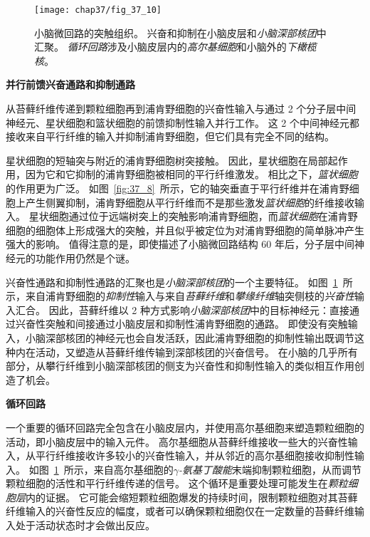 \begin{figure}[htbp]
	\centering
	\texttt{[image: chap37/fig\_37\_10]}
	\caption{小脑微回路的突触组织。
		兴奋和抑制在小脑皮层和\textit{小脑深部核团}中汇聚。
		\textit{循环回路}涉及小脑皮层内的\textit{高尔基细胞}和小脑外的\textit{下橄榄核}\cite{raymond1996cerebellum}。}
	\label{fig:37_10}
\end{figure}


\textbf{并行前馈兴奋通路和抑制通路}


从苔藓纤维传递到颗粒细胞再到浦肯野细胞的兴奋性输入与通过 2 个分子层中间神经元、星状细胞和篮状细胞的前馈抑制性输入并行工作。
这 2 个中间神经元都接收来自平行纤维的输入并抑制浦肯野细胞，但它们具有完全不同的结构。


星状细胞的短轴突与附近的浦肯野细胞树突接触。
因此，星状细胞在局部起作用，因为它和它抑制的浦肯野细胞被相同的平行纤维激发。
相比之下，\textit{篮状细胞}的作用更为广泛。
如图~\ref{fig:37_8}~所示，它的轴突垂直于平行纤维并在浦肯野细胞上产生侧翼抑制，浦肯野细胞从平行纤维而不是那些激发\textit{篮状细胞}的纤维接收输入。
星状细胞通过位于远端树突上的突触影响浦肯野细胞，而\textit{篮状细胞}在浦肯野细胞的细胞体上形成强大的突触，并且似乎被定位为对浦肯野细胞的简单脉冲产生强大的影响。
值得注意的是，即使描述了小脑微回路结构 60 年后，分子层中间神经元的功能作用仍然是个谜。


兴奋性通路和抑制性通路的汇聚也是\textit{小脑深部核团}的一个主要特征。
如图~\ref{fig:37_10}~所示，来自浦肯野细胞的\textit{抑制性}输入与来自\textit{苔藓纤维}和\textit{攀缘纤维}轴突侧枝的\textit{兴奋性}输入汇合。
因此，苔藓纤维以 2 种方式影响\textit{小脑深部核团}中的目标神经元：直接通过兴奋性突触和间接通过小脑皮层和抑制性浦肯野细胞的通路。
即使没有突触输入，小脑深部核团的神经元也会自发活跃，因此浦肯野细胞的抑制性输出既调节这种内在活动，又塑造从苔藓纤维传输到深部核团的兴奋信号。
在小脑的几乎所有部分，从攀行纤维到小脑深部核团的侧支为兴奋性和抑制性输入的类似相互作用创造了机会。



\textbf{循环回路}

一个重要的循环回路完全包含在小脑皮层内，并使用高尔基细胞来塑造颗粒细胞的活动，即小脑皮层中的输入元件。
高尔基细胞从苔藓纤维接收一些大的兴奋性输入，从平行纤维接收许多较小的兴奋性输入，并从邻近的高尔基细胞接收抑制性输入。
如图~\ref{fig:37_10}~所示，来自高尔基细胞的\textit{$\gamma$-氨基丁酸能}末端抑制颗粒细胞，从而调节颗粒细胞的活性和平行纤维传递的信号。
这个循环是重要处理可能发生在\textit{颗粒细胞层}内的证据。
它可能会缩短颗粒细胞爆发的持续时间，限制颗粒细胞对其苔藓纤维输入的兴奋性反应的幅度，或者可以确保颗粒细胞仅在一定数量的苔藓纤维输入处于活动状态时才会做出反应。


